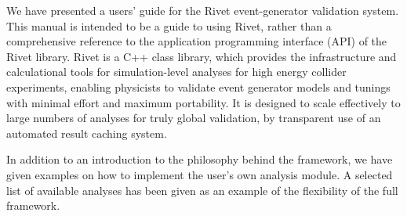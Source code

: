 We have presented a users' guide for the Rivet event-generator validation
system. This manual is intended to be a
guide to using Rivet, rather than a comprehensive
reference to the application programming interface (API) of the Rivet
library. Rivet is a C++ class library, which provides the infrastructure and
calculational tools for simulation-level analyses for high energy collider
experiments, enabling physicists to
validate event generator models and tunings with minimal effort and maximum
portability. It is designed to scale effectively to large numbers of analyses
for truly global validation, by transparent use of an automated result caching
system.

In addition to an introduction to the philosophy behind the framework, we
have given examples on how to implement the user's own analysis module.
A selected list of available analyses has been given as an example of the
flexibility of the full framework.
